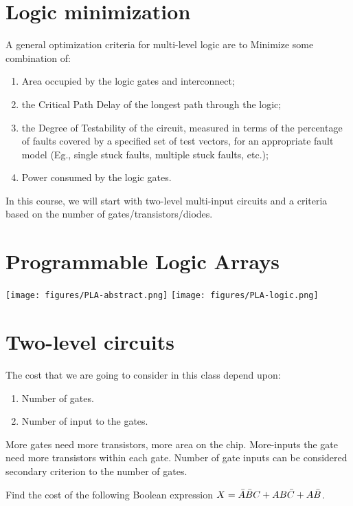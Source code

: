 \maketitle

\section{Logic minimization}

A general optimization criteria for multi-level logic are to Minimize
some combination of:
\begin{enumerate}
\item Area occupied by the logic gates and interconnect;
\item the Critical Path Delay of the longest path through the logic;
\item the Degree of Testability of the circuit, measured in terms of the percentage
of faults covered by a specified set of test vectors, for an appropriate fault model
(Eg., single stuck faults, multiple stuck faults, etc.);
\item Power consumed by the logic gates.
\end{enumerate}

In this course, we will start with two-level multi-input circuits and a criteria
based on the number of gates/transistors/diodes.

\section{Programmable Logic Arrays}
\texttt{[image: figures/PLA-abstract.png]}
\texttt{[image: figures/PLA-logic.png]}

\section{Two-level circuits}
The cost that we are going to consider in this class depend upon:
\begin{enumerate}
\item Number of gates.
\item Number of input to the gates.
\end{enumerate}
More gates need more transistors, more area on the chip. More-inputs the gate
need more transistors within each gate. Number of gate inputs can be considered
secondary criterion to the number of gates.

\begin{example}
  Find the cost of the following Boolean expression $X = \bar{A}\bar{B} C + AB\bar{C} + A\bar{B}$.
\end{example}

